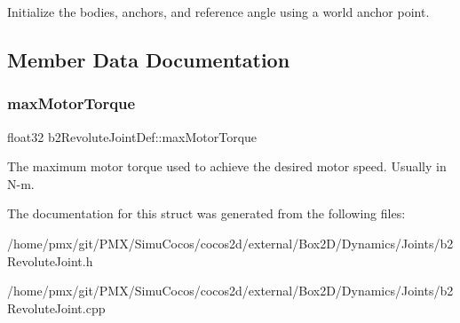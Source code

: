 Initialize the bodies, anchors, and reference angle using a world anchor point. 

\subsection{Member Data Documentation}
\mbox{\label{structb2RevoluteJointDef_a9fc1b67fe6d1bc31f88cc2cfd681fe30}} 
\subsubsection{\texorpdfstring{max\+Motor\+Torque}{maxMotorTorque}}
{\footnotesize\ttfamily float32 b2\+Revolute\+Joint\+Def\+::max\+Motor\+Torque}

The maximum motor torque used to achieve the desired motor speed. Usually in N-\/m. 

The documentation for this struct was generated from the following files\+:\begin{DoxyCompactItemize}
\item 
/home/pmx/git/\+P\+M\+X/\+Simu\+Cocos/cocos2d/external/\+Box2\+D/\+Dynamics/\+Joints/b2\+Revolute\+Joint.\+h\item 
/home/pmx/git/\+P\+M\+X/\+Simu\+Cocos/cocos2d/external/\+Box2\+D/\+Dynamics/\+Joints/b2\+Revolute\+Joint.\+cpp\end{DoxyCompactItemize}
